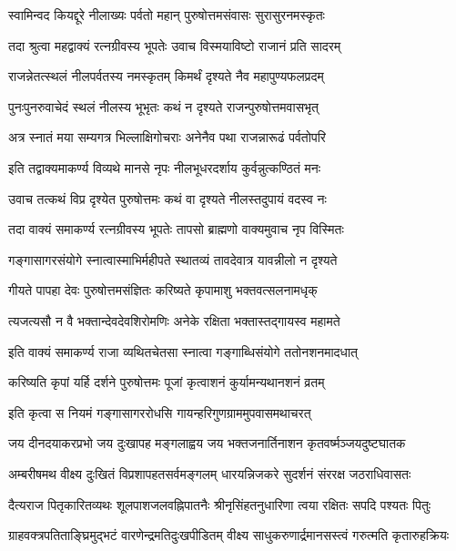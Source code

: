 \twolineshloka
{स्वामिन्वद कियद्दूरे नीलाख्यः पर्वतो महान्}
{पुरुषोत्तमसंवासः सुरासुरनमस्कृतः}%

\twolineshloka
{तदा श्रुत्वा महद्वाक्यं रत्नग्रीवस्य भूपतेः}
{उवाच विस्मयाविष्टो राजानं प्रति सादरम्}%

\twolineshloka
{राजन्नेतत्स्थलं नीलपर्वतस्य नमस्कृतम्}
{किमर्थं दृश्यते नैव महापुण्यफलप्रदम्}%

\twolineshloka
{पुनःपुनरुवाचेदं स्थलं नीलस्य भूभृतः}
{कथं न दृश्यते राजन्पुरुषोत्तमवासभृत्}%

\twolineshloka
{अत्र स्नातं मया सम्यगत्र भिल्लाक्षिगोचराः}
{अनेनैव पथा राजन्नारूढं पर्वतोपरि}%

\twolineshloka
{इति तद्वाक्यमाकर्ण्य विव्यथे मानसे नृपः}
{नीलभूधरदर्शाय कुर्वन्नुत्कण्ठितं मनः}%

\twolineshloka
{उवाच तत्कथं विप्र दृश्येत पुरुषोत्तमः}
{कथं वा दृश्यते नीलस्तदुपायं वदस्व नः}%

\twolineshloka
{तदा वाक्यं समाकर्ण्य रत्नग्रीवस्य भूपतेः}
{तापसो ब्राह्मणो वाक्यमुवाच नृप विस्मितः}%

\twolineshloka
{गङ्गासागरसंयोगे स्नात्वास्माभिर्महीपते}
{स्थातव्यं तावदेवात्र यावन्नीलो न दृश्यते}%

\twolineshloka
{गीयते पापहा देवः पुरुषोत्तमसंज्ञितः}
{करिष्यते कृपामाशु भक्तवत्सलनामधृक्}%

\twolineshloka
{त्यजत्यसौ न वै भक्तान्देवदेवशिरोमणिः}
{अनेके रक्षिता भक्तास्तद्गायस्व महामते}%

\twolineshloka
{इति वाक्यं समाकर्ण्य राजा व्यथितचेतसा}
{स्नात्वा गङ्गाब्धिसंयोगे ततोनशनमादधात्}%

\twolineshloka
{करिष्यति कृपां यर्हि दर्शने पुरुषोत्तमः}
{पूजां कृत्वाशनं कुर्यामन्यथानशनं व्रतम्}%

\twolineshloka
{इति कृत्वा स नियमं गङ्गासागररोधसि}
{गायन्हरिगुणग्राममुपवासमथाचरत्}%


\twolineshloka
{जय दीनदयाकरप्रभो जय दुःखापह मङ्गलाह्वय}
{जय भक्तजनार्तिनाशन कृतवर्ष्मञ्जयदुष्टघातक}%

\twolineshloka
{अम्बरीषमथ वीक्ष्य दुःखितं विप्रशापहतसर्वमङ्गलम्}
{धारयन्निजकरे सुदर्शनं संररक्ष जठराधिवासतः}%

\twolineshloka
{दैत्यराज पितृकारितव्यथः शूलपाशजलवह्निपातनैः}
{श्रीनृसिंहतनुधारिणा त्वया रक्षितः सपदि पश्यतः पितुः}%

\twolineshloka
{ग्राहवक्त्रपतिताङ्घ्रिमुद्भटं वारणेन्द्रमतिदुःखपीडितम्}
{वीक्ष्य साधुकरुणार्द्रमानसस्त्वं गरुत्मति कृतारुहक्रियः}%

